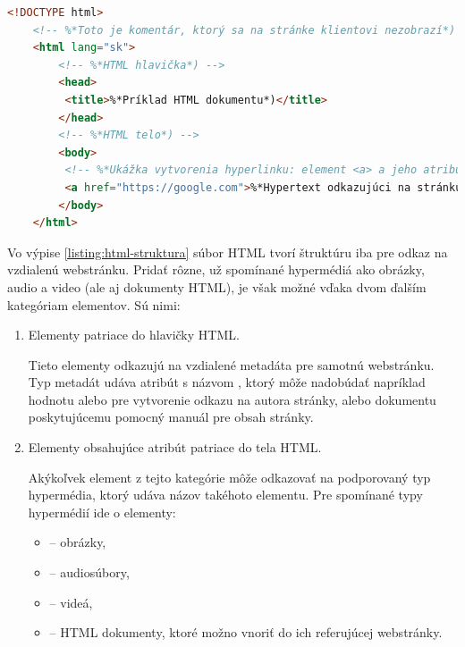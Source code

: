 \begin{center}
\centering
\begin{lstlisting}[caption={\centering Základná štruktúra HTML dokumentu. HTML obsahuje počiatočnú definíciu typu dokumentu (\code{<!DOCTYPE html>}), hlavičku, telo, hyperlink a popisné komentáre.},
label=listing:html-struktura, 
language=HTML, 
frame=tb,
xleftmargin=.05\textwidth, 
xrightmargin=.05\textwidth]
    <!DOCTYPE html>
    <!-- %*Toto je komentár, ktorý sa na stránke klientovi nezobrazí*) -->
    <html lang="sk">       
        <!-- %*HTML hlavička*) -->
        <head>
         <title>%*Príklad HTML dokumentu*)</title>
        </head>
        <!-- %*HTML telo*) -->
        <body>
         <!-- %*Ukážka vytvorenia hyperlinku: element <a> a jeho atribút href*) -->
         <a href="https://google.com">%*Hypertext odkazujúci na stránku google*)</a>
        </body>
    </html>
\end{lstlisting}
\end{center}

Vo výpise \ref{listing:html-struktura} súbor HTML tvorí štruktúru iba pre odkaz na vzdialenú webstránku.
Pridať rôzne, už spomínané hypermédiá ako obrázky, audio a video (ale aj dokumenty HTML), je však možné vďaka dvom ďalším kategóriam elementov. 
Sú nimi: 
\begin{enumerate}
    \item Elementy  patriace do hlavičky HTML.

    Tieto elementy odkazujú na vzdialené metadáta pre samotnú webstránku.
    Typ metadát udáva atribút s názvom , ktorý môže nadobúdať napríklad hodnotu 
     alebo  pre vytvorenie odkazu na autora stránky, alebo dokumentu poskytujúcemu 
    pomocný manuál pre obsah stránky.
    
    \item Elementy obsahujúce atribút  patriace do tela HTML.

    Akýkoľvek element z tejto kategórie môže odkazovať na podporovaný typ hypermédia, 
    ktorý udáva názov takéhoto elementu.
    Pre spomínané typy hypermédií ide o elementy: 
    \begin{itemize}
        \item {} -- obrázky,
        \item {} -- audiosúbory,
        \item {} -- videá,
        \item {} -- HTML dokumenty, ktoré možno vnoriť do ich referujúcej webstránky.
    \end{itemize}
    
\end{enumerate}

